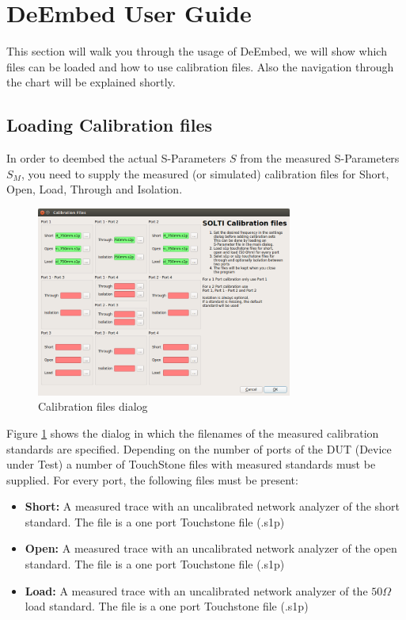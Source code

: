 \section{DeEmbed User Guide}
This section will walk you through the usage of DeEmbed, we will show which files can be loaded and how to use calibration files. Also the navigation through the chart will be explained shortly.
\subsection{Loading Calibration files}
\label{sec:loadingcalfiles}
In order to deembed the actual S-Parameters $S$ from the measured S-Parameters $S_M$, you need to supply the measured (or simulated) calibration files for Short, Open, Load, Through and Isolation. 
\begin{figure}[H]
	\centering
	\includegraphics[width=0.75\textwidth]{figures/screenshot3.png}
	\caption{Calibration files dialog}
	\label{fig:caldialog}
\end{figure}
Figure \ref{fig:caldialog} shows the dialog in which the filenames of the measured calibration standards are specified. Depending on the number of ports of the DUT (Device under Test) a number of TouchStone files with measured standards must be supplied. For every port, the following files must be present:
\begin{itemize}
	\item {\textbf{Short:} A measured trace with an uncalibrated network analyzer of the short standard. The file is a one port Touchstone file (.s1p) }
	\item {\textbf{Open:} A measured trace with an uncalibrated network analyzer of the open standard. The file is a one port Touchstone file (.s1p) }
	\item {\textbf{Load:} A measured trace with an uncalibrated network analyzer of the $50\Omega$ load standard. The file is a one port Touchstone file (.s1p) }

\end{itemize}
